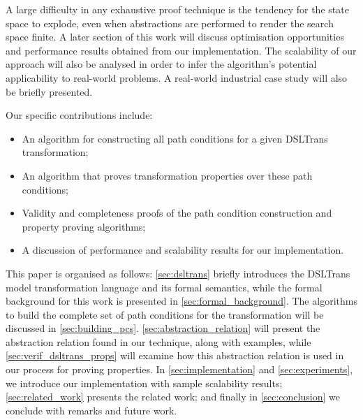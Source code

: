 
A large difficulty in any exhaustive proof technique is the tendency for the
state space to explode, even when abstractions are performed to render the
search space finite.  A later section of this work will discuss optimisation
opportunities and performance results obtained from our implementation. The
scalability of our approach will also be analysed in order to infer the
algorithm's potential applicability to real-world problems. A real-world industrial case study will also be briefly presented.

Our specific contributions include:

\begin{itemize}
\item An algorithm for constructing all path conditions for a given DSLTrans transformation;
\item An algorithm that proves transformation properties over these path conditions;
\item Validity and completeness proofs of the path condition construction and property proving algorithms;
\item A discussion of performance and scalability results for our implementation.
\end{itemize}

This paper is organised as follows: \cref{sec:dsltrans} briefly introduces
the DSLTrans model transformation language and its formal semantics, while the formal background for this work is presented in \cref{sec:formal_background}. The algorithms to build the complete set of path
conditions for the transformation will be discussed in
\cref{sec:building_pcs}. \cref{sec:abstraction_relation} will present the abstraction relation found in our technique, along with examples, while \cref{sec:verif_dsltrans_props} will examine how this abstraction relation is used in our process for proving properties. In \cref{sec:implementation} and \cref{sec:experiments}, we introduce our implementation with sample scalability results; \cref{sec:related_work} presents the related work;
and finally in \cref{sec:conclusion} we conclude with remarks and future
work.
